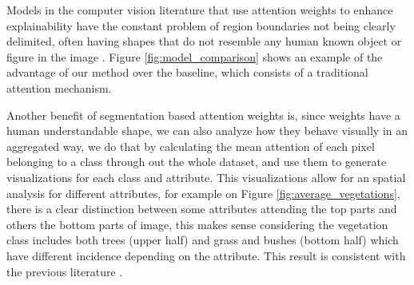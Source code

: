Models in the computer vision literature that use attention
weights to enhance explainability have the constant
problem of region boundaries not being clearly delimited, often having
shapes that do not resemble any human known object or figure in the image
\cite{zhang_interpretable,zhang_relation,johnston_depth,carion_object}.
Figure \ref{fig:model_comparison} shows an example
of the advantage of our method over the baseline, which consists of
a traditional attention mechanism.

Another benefit of segmentation based attention weights
is, since weights have a human understandable shape,
we can also analyze how they behave visually
in an aggregated way, we do that by calculating the mean
attention of each pixel belonging
to a class through out the whole dataset, and use them to
generate visualizations for each class and attribute.
This visualizations allow  for an spatial analysis for
different attributes, for example on Figure \ref{fig:average_vegetations},
there is a clear distinction between some attributes attending the top parts
and others the bottom parts of image, this makes sense considering the vegetation
class includes both trees (upper half) and grass and bushes (bottom half) which
have different incidence depending on the attribute. This result
is consistent with the previous literature \cite{rossetti, zhang_measuring}.

